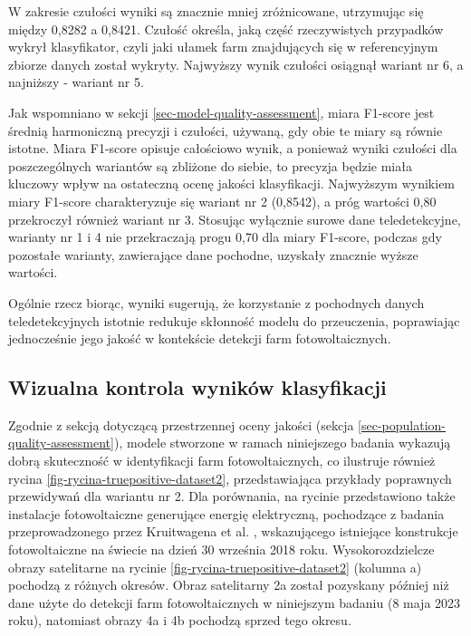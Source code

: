 \documentclass{amuthesis}
\begin{document}
W zakresie czułości wyniki są znacznie mniej zróżnicowane, utrzymując
się między 0,8282 a 0,8421. Czułość określa, jaką część rzeczywistych
przypadków wykrył klasyfikator, czyli jaki ułamek farm znajdujących się
w referencyjnym zbiorze danych został wykryty. Najwyższy wynik czułości
osiągnął wariant nr 6, a najniższy - wariant nr 5.

Jak wspomniano w sekcji \ref{sec-model-quality-assessment}, miara
F1-score jest średnią harmoniczną precyzji i czułości, używaną, gdy obie
te miary są równie istotne. Miara F1-score opisuje całościowo wynik, a
ponieważ wyniki czułości dla poszczególnych wariantów są zbliżone do
siebie, to precyzja będzie miała kluczowy wpływ na ostateczną ocenę
jakości klasyfikacji. Najwyższym wynikiem miary F1-score charakteryzuje
się wariant nr 2 (0,8542), a próg wartości 0,80 przekroczył również
wariant nr 3. Stosując wyłącznie surowe dane teledetekcyjne, warianty nr
1 i 4 nie przekraczają progu 0,70 dla miary F1-score, podczas gdy
pozostałe warianty, zawierające dane pochodne, uzyskały znacznie wyższe
wartości.

Ogólnie rzecz biorąc, wyniki sugerują, że korzystanie z pochodnych
danych teledetekcyjnych istotnie redukuje skłonność modelu do
przeuczenia, poprawiając jednocześnie jego jakość w kontekście detekcji
farm fotowoltaicznych.

\hypertarget{sec-visual-quality-assessment}{%
\subsection{Wizualna kontrola wyników
klasyfikacji}\label{sec-visual-quality-assessment}}

Zgodnie z sekcją dotyczącą przestrzennej oceny jakości (sekcja
\ref{sec-population-quality-assessment}), modele stworzone w ramach
niniejszego badania wykazują dobrą skuteczność w identyfikacji farm
fotowoltaicznych, co ilustruje również rycina
\ref{fig-rycina-truepositive-dataset2}, przedstawiająca przykłady
poprawnych przewidywań dla wariantu nr 2. Dla porównania, na rycinie
przedstawiono także instalacje fotowoltaiczne generujące energię
elektryczną, pochodzące z badania przeprowadzonego przez Kruitwagena et
al. \autocite*{kruitwagen_2021_pv}, wskazującego istniejące konstrukcje
fotowoltaiczne na świecie na dzień 30 września 2018 roku.
Wysokorozdzielcze obrazy satelitarne na rycinie
\ref{fig-rycina-truepositive-dataset2} (kolumna a) pochodzą z różnych
okresów. Obraz satelitarny 2a został pozyskany później niż dane użyte do
detekcji farm fotowoltaicznych w niniejszym badaniu (8 maja 2023 roku),
natomiast obrazy 4a i 4b pochodzą sprzed tego okresu.
\end{document}
